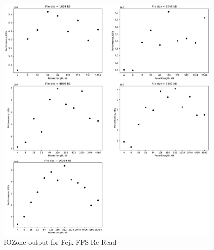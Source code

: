 \begin{figure}[!htb]
	\label{fig:app_bench_fffs_re_read}
	\begin{center}
		\includegraphics[width=1.0\textwidth]{figures/benchmarking/fake-ffs/Re-Read.pdf}
	\end{center}
	\caption{IOZone output for Fejk \gls{FFS} Re-Read}
\end{figure}


